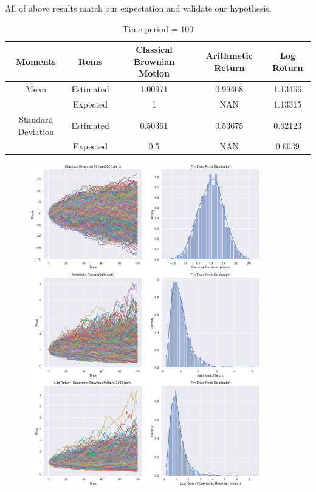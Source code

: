 \documentclass[11pt,en]{elegantpaper}
\begin{document}
All of above results match our expectation and validate our hypothesis.

\begin{table}[htbp]
    \centering
    \caption{Time period = 100}
    \label{table2}
    \begin{tabular}{@{}ccccc@{}}
        \toprule
        \textbf{Moments} & \textbf{Items} & \textbf{Classical Brownian Motion} & \textbf{Arithmetic Return} & \textbf{Log Return}\\
        \midrule
        Mean & Estimated  & 1.00971 & 0.99468 & 1.13466 \\
        & Expected  & 1       & NAN     & 1.13315 \\
        Standard Deviation& Estimated  & 0.50361 & 0.53675 & 0.62123 \\
        & Expected & 0.5     & NAN     & 0.6039 \\
        \bottomrule
    \end{tabular}
\end{table}

\begin{figure}[htbp] 
    \centering 
    \includegraphics[width=0.9\textwidth]{./image/Problem1_2.png} 
\end{figure}
\end{document}
